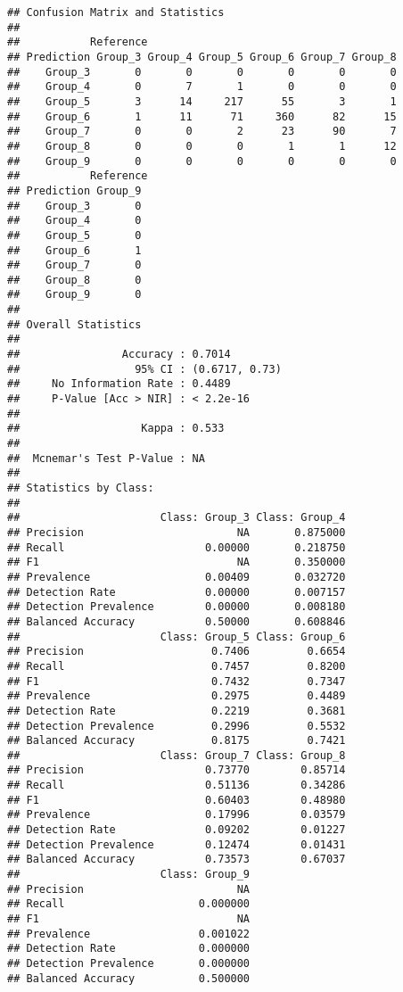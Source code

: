 \documentclass[
]{book}
\begin{document}
\begin{verbatim}
## Confusion Matrix and Statistics
## 
##           Reference
## Prediction Group_3 Group_4 Group_5 Group_6 Group_7 Group_8
##    Group_3       0       0       0       0       0       0
##    Group_4       0       7       1       0       0       0
##    Group_5       3      14     217      55       3       1
##    Group_6       1      11      71     360      82      15
##    Group_7       0       0       2      23      90       7
##    Group_8       0       0       0       1       1      12
##    Group_9       0       0       0       0       0       0
##           Reference
## Prediction Group_9
##    Group_3       0
##    Group_4       0
##    Group_5       0
##    Group_6       1
##    Group_7       0
##    Group_8       0
##    Group_9       0
## 
## Overall Statistics
##                                         
##                Accuracy : 0.7014        
##                  95% CI : (0.6717, 0.73)
##     No Information Rate : 0.4489        
##     P-Value [Acc > NIR] : < 2.2e-16     
##                                         
##                   Kappa : 0.533         
##                                         
##  Mcnemar's Test P-Value : NA            
## 
## Statistics by Class:
## 
##                      Class: Group_3 Class: Group_4
## Precision                        NA       0.875000
## Recall                      0.00000       0.218750
## F1                               NA       0.350000
## Prevalence                  0.00409       0.032720
## Detection Rate              0.00000       0.007157
## Detection Prevalence        0.00000       0.008180
## Balanced Accuracy           0.50000       0.608846
##                      Class: Group_5 Class: Group_6
## Precision                    0.7406         0.6654
## Recall                       0.7457         0.8200
## F1                           0.7432         0.7347
## Prevalence                   0.2975         0.4489
## Detection Rate               0.2219         0.3681
## Detection Prevalence         0.2996         0.5532
## Balanced Accuracy            0.8175         0.7421
##                      Class: Group_7 Class: Group_8
## Precision                   0.73770        0.85714
## Recall                      0.51136        0.34286
## F1                          0.60403        0.48980
## Prevalence                  0.17996        0.03579
## Detection Rate              0.09202        0.01227
## Detection Prevalence        0.12474        0.01431
## Balanced Accuracy           0.73573        0.67037
##                      Class: Group_9
## Precision                        NA
## Recall                     0.000000
## F1                               NA
## Prevalence                 0.001022
## Detection Rate             0.000000
## Detection Prevalence       0.000000
## Balanced Accuracy          0.500000
\end{verbatim}
\end{document}

